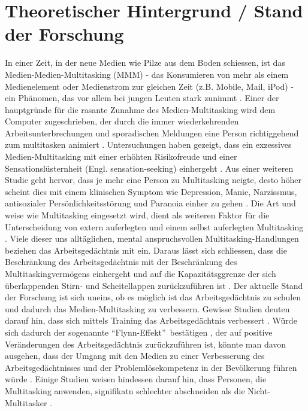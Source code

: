 \section*{Theoretischer Hintergrund / Stand der Forschung}\label{section.forschung}
In einer Zeit, in der neue Medien wie Pilze aus dem Boden schiessen, ist das Medien-Medien-Multitasking (MMM) - das Konsumieren von mehr als einem Medienelement oder Medienstrom zur gleichen Zeit (z.B. Mobile, Mail, iPod) - ein Phänomen, das vor allem bei jungen Leuten stark zunimmt \cite{Rideout2010}. Einer der hauptgründe für die rasante Zunahme des Medien-Multitasking wird dem Computer zugeschrieben, der durch die immer wiederkehrenden Arbeitsunterbrechungen und sporadischen Meldungen eine  Person richtiggehend zum multitasken animiert \cite{Foehr2006}.  Untersuchungen haben gezeigt, dass ein exzessives Medien-Multitasking mit einer erhöhten Risikofreude und einer Sensationslüsternheit (Engl. sensation-seeking) einhergeht \cite{Foehr2006}. Aus einer weiteren Studie geht hervor, dass je mehr eine Person zu Multitasking neigte, desto höher scheint dies mit einem klinischen Symptom wie Depression, Manie, Narzissmus, antisozialer Persönlichkeitsstörung und Paranoia einher zu gehen \cite{Rosen2013}. Die Art und weise wie Multitasking eingesetzt wird, dient als weiteren Faktor für die Unterscheidung von extern auferlegten und einem selbst auferlegten Multitasking \cite{Shih2013}. Viele dieser uns alltäglichen, mental anspruchsvollen Multitasking-Handlungen beziehen das Arbeitsgedächtnis mit ein. Daraus lässt sich schliessen, dass die Beschränkung des Arbeitsgedächtnis mit der Beschränkung des Multitaskingvermögens einhergeht und auf die Kapazitätsggrenze der sich überlappenden Stirn- und Scheitellappen zurückzuführen ist \cite{Klingberg2008}. Der aktuelle Stand der Forschung ist sich uneins, ob es möglich ist das Arbeitsgedächtnis zu schulen und dadurch das Medien-Multitasking zu verbessern. Gewisse Studien deuten darauf hin, dass sich mittels Training das Arbeitsgedächtnis verbessert \cite{Hernstein1986, Feuerstein1985, Stankov1986}. Würde sich dadurch der sogenannte \textquotedblleft Flynn-Effekt\textquotedblright \ bestätigen \cite{Flynn1987}, der auf positive Veränderungen des Arbeitsgedächtnis zurückzuführen ist, könnte man davon ausgehen, dass der Umgang mit den Medien zu einer Verbesserung des Arbeitsgedächtnisses und der Problemlösekompetenz in der Bevölkerung führen würde \cite{Klingberg2008}. Einige Studien weisen hindessen darauf hin, dass Personen, die Multitasking anwenden, signifikatn schlechter abschneiden als die Nicht-Multitasker \cite{Spitzer2012}.\\
